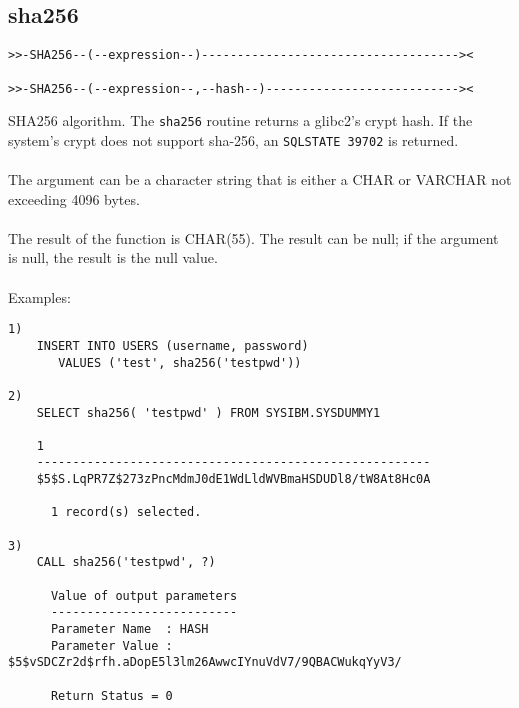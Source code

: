 \subsection{sha256} \label{sha256}
\begin{verbatim}
>>-SHA256--(--expression--)------------------------------------><

>>-SHA256--(--expression--,--hash--)---------------------------><
\end{verbatim}
SHA256 algorithm. The {\tt sha256} routine returns a glibc2's crypt hash. If the system's crypt does not support sha-256, an \mbox{{\tt SQLSTATE 39702}} is returned.\\
\\
The argument can be a character string that is either a \mbox{CHAR} or \mbox{VARCHAR} not exceeding 4096 bytes.\\
\\
The result of the function is CHAR(55). The result can be null; if the argument is null, the result is the null value.\\
\\
Examples:
\begin{verbatim}
1)
    INSERT INTO USERS (username, password)
       VALUES ('test', sha256('testpwd'))

2)
    SELECT sha256( 'testpwd' ) FROM SYSIBM.SYSDUMMY1

    1
    -------------------------------------------------------
    $5$S.LqPR7Z$273zPncMdmJ0dE1WdLldWVBmaHSDUDl8/tW8At8Hc0A

      1 record(s) selected.

3)
    CALL sha256('testpwd', ?)

      Value of output parameters
      --------------------------
      Parameter Name  : HASH
      Parameter Value : $5$vSDCZr2d$rfh.aDopE5l3lm26AwwcIYnuVdV7/9QBACWukqYyV3/

      Return Status = 0
\end{verbatim}
\newpage
\hypertarget{hsha512}{}
